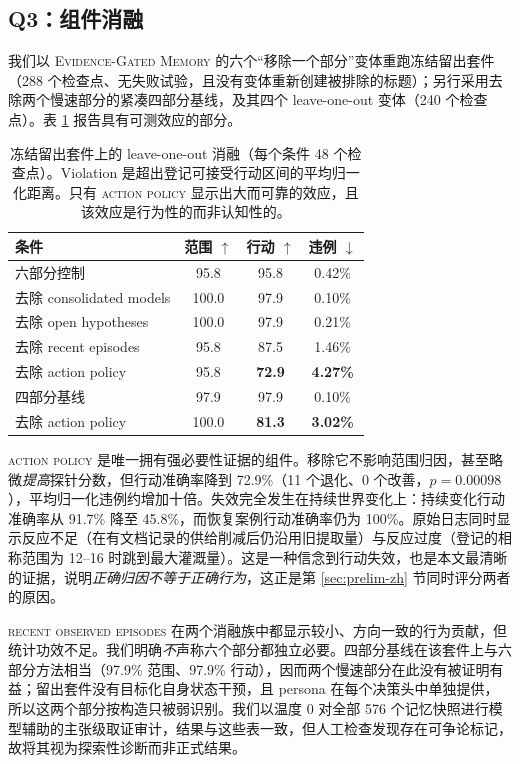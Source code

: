 \documentclass[UTF8,11pt]{ctexart}
\newcommand{\egm}{\textsc{Evidence-Gated Memory}}
\begin{document}
\subsection{Q3：组件消融}\label{sec:ablation-zh}

我们以 \egm{} 的六个“移除一个部分”变体重跑冻结留出套件（288 个检查点、无失败试验，且没有变体重新创建被排除的标题）；另行采用去除两个慢速部分的紧凑四部分基线，及其四个 leave-one-out 变体（240 个检查点）。表 \ref{tab:ablation-zh} 报告具有可测效应的部分。

\begin{table}[t]
\centering\small
\caption{冻结留出套件上的 leave-one-out 消融（每个条件 48 个检查点）。Violation 是超出登记可接受行动区间的平均归一化距离。只有 \textsc{action policy} 显示出大而可靠的效应，且该效应是行为性的而非认知性的。}
\label{tab:ablation-zh}
\begin{tabular}{lccc}
\toprule
条件 & 范围 $\uparrow$ & 行动 $\uparrow$ & 违例 $\downarrow$\\
\midrule
六部分控制 & 95.8 & 95.8 & 0.42\%\\
\quad 去除 consolidated models & 100.0 & 97.9 & 0.10\%\\
\quad 去除 open hypotheses & 100.0 & 97.9 & 0.21\%\\
\quad 去除 recent episodes & 95.8 & 87.5 & 1.46\%\\
\quad 去除 action policy & 95.8 & \textbf{72.9} & \textbf{4.27\%}\\
\midrule
四部分基线 & 97.9 & 97.9 & 0.10\%\\
\quad 去除 action policy & 100.0 & \textbf{81.3} & \textbf{3.02\%}\\
\bottomrule
\end{tabular}
\end{table}

\textsc{action policy} 是唯一拥有强必要性证据的组件。移除它不影响范围归因，甚至略微\emph{提高}探针分数，但行动准确率降到 72.9\%（11 个退化、0 个改善，$p=0.00098$），平均归一化违例约增加十倍。失效完全发生在持续世界变化上：持续变化行动准确率从 91.7\% 降至 45.8\%，而恢复案例行动准确率仍为 100\%。原始日志同时显示反应不足（在有文档记录的供给削减后仍沿用旧提取量）与反应过度（登记的相称范围为 12--16 时跳到最大灌溉量）。这是一种信念到行动失效，也是本文最清晰的证据，说明\emph{正确归因不等于正确行为}，这正是第 \ref{sec:prelim-zh} 节同时评分两者的原因。

\textsc{recent observed episodes} 在两个消融族中都显示较小、方向一致的行为贡献，但统计功效不足。我们明确\emph{不}声称六个部分都独立必要。四部分基线在该套件上与六部分方法相当（97.9\% 范围、97.9\% 行动），因而两个慢速部分在此没有被证明有益；留出套件没有目标化自身状态干预，且 persona 在每个决策头中单独提供，所以这两个部分按构造只被弱识别。我们以温度 0 对全部 576 个记忆快照进行模型辅助的主张级取证审计，结果与这些表一致，但人工检查发现存在可争论标记，故将其视为探索性诊断而非正式结果。
\end{document}
